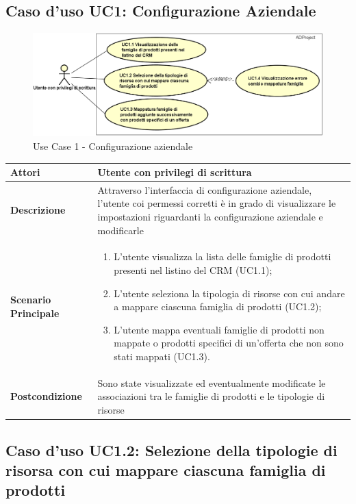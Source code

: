 
	\hypertarget{UC1}{}
	\subsection{Caso d'uso UC1: Configurazione Aziendale}
	
	\begin{figure}[H]
		\centering
		\includegraphics[scale=0.6]{images/useCase/UC1}
		\caption{Use Case 1 - Configurazione aziendale}
		\label{fig:uc1}
	\end{figure}
	\begin{longtable}{ | p{2.7cm} | p{12cm} |}
		\hline \textbf{Attori} & Utente con privilegi di scrittura\\ 
		\hline \textbf{Descrizione} & Attraverso l’interfaccia di configurazione aziendale, l’utente coi permessi corretti è in grado di visualizzare le impostazioni riguardanti la configurazione aziendale e modificarle\\ 
		\hline \textbf{Scenario Principale} & \begin{enumerate}
			\itemsep-0.5em 
			\item L’utente visualizza la lista delle famiglie di prodotti presenti nel listino del CRM  (UC1.1);
			\item L’utente seleziona la tipologia di risorse con cui andare a mappare ciascuna famiglia di prodotti  (UC1.2);
			\item L’utente mappa eventuali famiglie di prodotti non mappate o prodotti specifici di un’offerta che non sono stati mappati  (UC1.3).
			
		\end{enumerate}
		\\ 
		\hline \textbf{Postcondizione} & Sono state visualizzate ed eventualmente modificate le associazioni tra le famiglie di prodotti e le tipologie di risorse\\ 
		\hline 
	\end{longtable}
	
	\hypertarget{UC1.2}{}
	\subsection{Caso d'uso UC1.2: Selezione della tipologie di risorsa con cui mappare ciascuna famiglia di prodotti}
	
